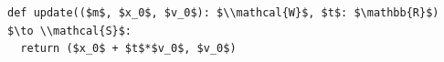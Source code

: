 \documentclass[border=10pt]{standalone}
\begin{document}
\begin{lstlisting}
def update(($m$, $x_0$, $v_0$): $\\mathcal{W}$, $t$: $\mathbb{R}$) $\to \\mathcal{S}$:
  return ($x_0$ + $t$*$v_0$, $v_0$)
\end{lstlisting}
\end{document}
